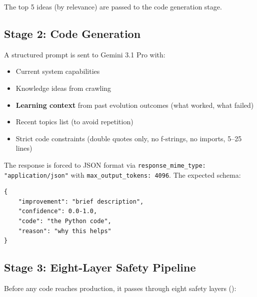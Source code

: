 \documentclass[11pt,a4paper]{article}
\begin{document}
The top 5 ideas (by relevance) are passed to the code generation stage.

\subsection{Stage 2: Code Generation}

A structured prompt is sent to Gemini 3.1 Pro with:
\begin{itemize}[noitemsep]
    \item Current system capabilities
    \item Knowledge ideas from crawling
    \item \textbf{Learning context} from past evolution outcomes (what worked, what failed)
    \item Recent topics list (to avoid repetition)
    \item Strict code constraints (double quotes only, no f-strings, no imports, 5--25 lines)
\end{itemize}

The response is forced to JSON format via \texttt{response\_mime\_type: "application/json"} with \texttt{max\_output\_tokens: 4096}. The expected schema:

\begin{lstlisting}[caption={Evolution response schema.}]
{
    "improvement": "brief description",
    "confidence": 0.0-1.0,
    "code": "the Python code",
    "reason": "why this helps"
}
\end{lstlisting}

\subsection{Stage 3: Eight-Layer Safety Pipeline}

Before any code reaches production, it passes through eight safety layers ():
\end{document}
